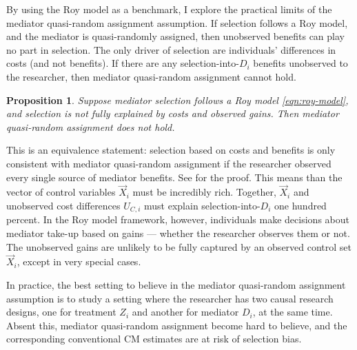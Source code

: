 By using the Roy model as a benchmark, I explore the practical limits of the mediator quasi-random assignment assumption.
If selection follows a Roy model, and the mediator is quasi-randomly assigned, then unobserved benefits can play no part in selection.
The only driver of selection are individuals' differences in costs (and not benefits).
If there are any selection-into-$D_i$ benefits unobserved to the researcher, then mediator quasi-random assignment cannot hold.
\newtheorem{proposition}{Proposition}
\begin{proposition}
    \label{prop:roy-seq-ig}
    Suppose mediator selection follows a Roy model \eqref{eqn:roy-model}, and selection is not fully explained by costs and observed gains.
    Then mediator quasi-random assignment does not hold.
\end{proposition}

This is an equivalence statement: selection based on costs and benefits is only consistent with mediator quasi-random assignment if the researcher observed every single source of mediator benefits.
See  for the proof.
This means than the vector of control variables $\vec X_i$ must be incredibly rich.
Together, $\vec X_i$ and unobserved cost differences $U_{C,i}$ must explain selection-into-$D_i$ one hundred percent.
In the Roy model framework, however, individuals make decisions about mediator take-up based on gains --- whether the researcher observes them or not.
The unobserved gains are unlikely to be fully captured by an observed control set $\vec X_i$, except in very special cases.

In practice, the best setting to believe in the mediator quasi-random assignment assumption is to study a setting where the researcher has two causal research designs, one for treatment $Z_i$ and another for mediator $D_i$, at the same time.
Absent this, mediator quasi-random assignment become hard to believe, and the corresponding conventional CM estimates are at risk of selection bias.

% 
% 
% 
